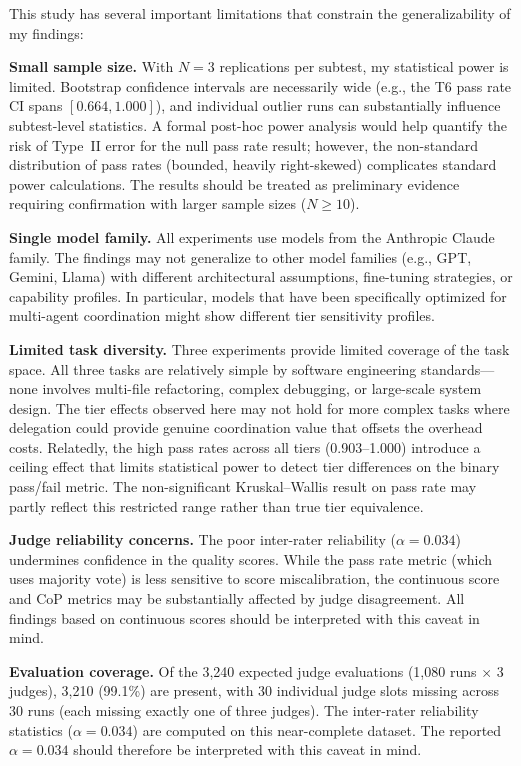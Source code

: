 \documentclass[11pt]{article}
\begin{document}
This study has several important limitations that constrain the
generalizability of my findings:

\textbf{Small sample size.} With $N=3$ replications per subtest, my
statistical power is limited. Bootstrap confidence intervals are necessarily
wide (e.g., the T6 pass rate CI spans $[0.664, 1.000]$), and individual
outlier runs can substantially influence subtest-level statistics. A formal post-hoc power analysis would help
quantify the risk of Type~II error for the null pass rate result; however,
the non-standard distribution of pass rates (bounded, heavily right-skewed)
complicates standard power calculations. The results should be treated as
preliminary evidence requiring confirmation with larger sample sizes
($N \geq 10$).

\textbf{Single model family.} All experiments use models from the Anthropic
Claude family. The findings may not generalize to other model families (e.g.,
GPT, Gemini, Llama) with different architectural assumptions, fine-tuning
strategies, or capability profiles. In particular, models that have been
specifically optimized for multi-agent coordination might show different tier
sensitivity profiles.

\textbf{Limited task diversity.} Three experiments provide limited coverage of
the task space. All three tasks are relatively simple by software engineering
standards---none involves multi-file refactoring, complex debugging, or
large-scale system design. The tier effects observed here may not hold for
more complex tasks where delegation could provide genuine coordination value
that offsets the overhead costs. Relatedly, the high pass rates across all
tiers (0.903--1.000) introduce a ceiling effect that limits statistical power
to detect tier differences on the binary pass/fail metric. The non-significant
Kruskal--Wallis result on pass rate may partly reflect this restricted range
rather than true tier equivalence.

\textbf{Judge reliability concerns.} The poor inter-rater reliability
($\alpha = 0.034$) undermines confidence in the quality scores. While the
pass rate metric (which uses majority vote) is less sensitive to score
miscalibration, the continuous score and CoP metrics may be substantially
affected by judge disagreement. All findings based on continuous scores
should be interpreted with this caveat in mind.

\textbf{Evaluation coverage.} Of the 3,240 expected judge
evaluations (1,080 runs $\times$ 3 judges), 3,210 (99.1\%) are present,
with 30 individual judge slots missing across 30 runs (each missing
exactly one of three judges). The inter-rater
reliability statistics ($\alpha = 0.034$) are computed on this near-complete
dataset. The reported
$\alpha = 0.034$ should therefore be interpreted with this caveat in mind.
\end{document}
